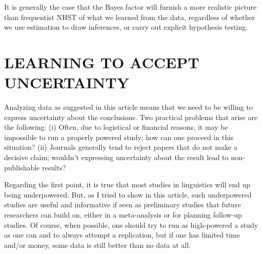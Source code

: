 \documentclass{ar-1col}\usepackage[]{graphicx}\usepackage[]{color}
\begin{document}
It is generally the case that the Bayes factor will furnish a more realistic picture than frequentist NHST of what we learned from the data, regardless of whether we use estimation to draw inferences, or carry out explicit hypothesis testing.  

\section{LEARNING TO ACCEPT UNCERTAINTY}

Analyzing data as suggested in this article means that we need to be willing to express uncertainty about the conclusions. Two practical problems that arise are the following: (i) Often, due to logistical or financial reasons, it may be impossible to run a properly powered study; how can one proceed in this situation? (ii) Journals generally tend to reject papers that do not make a decisive claim; wouldn't expressing uncertainty about the result lead to non-publishable results?

Regarding the first point, it is true that most studies in linguistics will end up being underpowered. But, as I tried to show in this article, such underpowered studies are useful and informative if seen as preliminary studies that future researchers can build on, either in a meta-analysis or for planning follow-up studies.  Of course, when possible, one should try to run as high-powered a study as one can and to always attempt a replication, but if one has limited time and/or money, some data is still better than no data at all.
\end{document}

